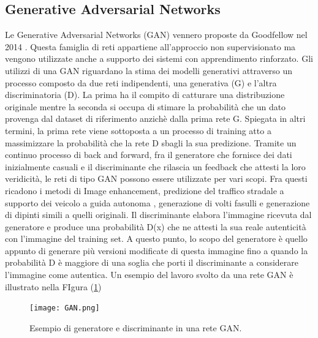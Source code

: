 \subsection{Generative Adversarial Networks}
Le Generative Adversarial Networks (GAN) vennero proposte da Goodfellow 
nel 2014 \cite{GAN}. Questa famiglia di reti appartiene all'approccio non 
supervisionato ma vengono utilizzate anche a supporto dei sistemi con 
apprendimento rinforzato. Gli utilizzi di una GAN riguardano la stima dei 
modelli generativi attraverso un processo composto da due reti indipendenti, 
una generativa (G) e l'altra discriminatoria (D). La prima ha il compito di 
catturare una distribuzione originale mentre la seconda si occupa di stimare 
la probabilità che un dato provenga dal dataset di riferimento anzichè dalla 
prima rete G. Spiegata in altri termini, la prima rete viene sottoposta a 
un processo di training atto a massimizzare la probabilità che la rete D 
sbagli la sua predizione. Tramite un continuo processo di back and forward, 
fra il generatore che fornisce dei dati inizialmente casuali e il discriminante 
che rilascia un feedback che attesti la loro veridicità, le reti di tipo GAN 
possono essere utilizzate per vari scopi. Fra questi ricadono i metodi di 
Image enhancement, predizione del traffico stradale a supporto dei veicolo 
a guida autonoma \cite{GAN-ADAS}, generazione di volti fasulli e generazione di dipinti 
simili a quelli originali. Il discriminante elabora l'immagine ricevuta dal 
generatore e produce una probabilità D(x) che ne attesti la sua reale autenticità 
con l'immagine del training set. A questo punto, lo scopo del 
generatore è quello appunto di generare più versioni modificate di questa 
immagine fino a quando la probabilità D è maggiore di una soglia che porti 
il discriminante a considerare l'immagine come autentica. Un esempio del 
lavoro svolto da una rete GAN è illustrato nella FIgura (\ref{gan-nn})
\begin{figure}
    \centering
    \texttt{[image: GAN.png]}
    \centering
    \caption{Esempio di generatore e discriminante in una rete GAN.}
    \label{gan-nn}
\end{figure}


